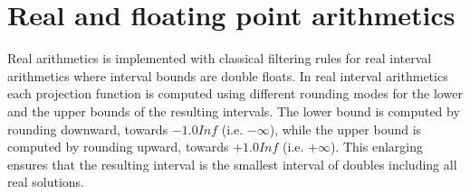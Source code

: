 \documentclass[a4paper]{article}
\newcommand{\COLIBRI}{\ensuremath{\mbox{\scshape Colibri}}\xspace}
\begin{document}


\section{Real and floating point arithmetics}\label{SubsecColibriRealFloat}
Real arithmetics is implemented with classical
filtering rules for real interval arithmetics
where interval bounds are double floats. In real interval arithmetics
each projection function is computed using different rounding modes for the lower
and the upper bounds of the resulting intervals. The lower bound is computed by
rounding downward, towards $-1.0\mathit{Inf}$ (i.e. $-\infty$),
while the upper bound is computed by rounding
upward, towards $+1.0\mathit{Inf}$ (i.e. $+\infty$).
This enlarging ensures that the resulting interval
is the smallest interval of doubles including all real solutions.
\end{document}
